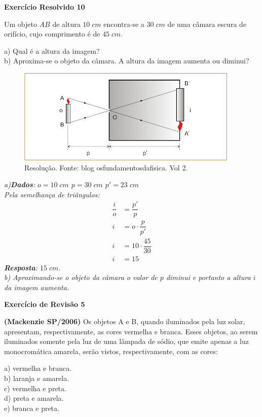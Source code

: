 \documentclass[11pt,twocolumn,oneside]{article}
\newenvironment{resposta*}
  {\bf Resposta:\\ }
  {}
\begin{document}
\textbf{Exercício Resolvido 10}


Um objeto $AB$ de altura $10\;cm$ encontra-se a $30\;cm$ de uma câmara escura de orifício, cujo comprimento é de $45\;cm$.


a) Qual é a altura da imagem? \\
b) Aproxima-se o objeto da câmara. A altura da imagem aumenta ou diminui?


\begin{figure}[h]{}
\centering\includegraphics[width=2.5truein]{imgexe2.png}
\caption{Resolução. Fonte: blog osfundamentosdafisica. Vol 2.}
\centering
\end{figure}

\begin{resposta*}
{\it a)\textbf{Dados}: $o=10\;cm$ $p=30\;cm$ $p'=23\;cm$ \\
Pela semelhança de triângulos:
\begin{align*}
    \dfrac{i}{o}    &= \dfrac{p'}{p} \\
    i               &= o\cdot \dfrac{p}{p'} \\
    i               &= 10\cdot \dfrac{45}{30} \\
    i               &= 15
\end{align*}
\textbf{Resposta}: $15\;cm$. \\
b) Aproximando-se o objeto da câmara o valor de $p$ diminui e portanto a altura $i$ da imagem aumenta.}
\end{resposta*}

\textbf{Exercício de Revisão 5}


\textbf{(Mackenzie SP/2006)} Os objetos A e B, quando iluminados pela luz solar, apresentam, respectivamente, as cores vermelha e branca. Esses objetos, ao serem iluminados somente pela luz de uma lâmpada de sódio, que emite apenas a luz monocromática amarela, serão vistos, respectivamente, com as cores:


a)	vermelha e branca. \\
b)	laranja e amarela. \\
c)	vermelha e preta. \\
d)	preta e amarela. \\
e)	branca e preta.
\end{document}
